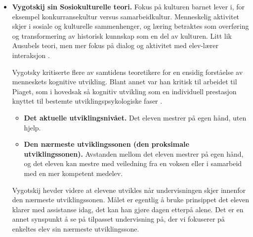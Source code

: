 \documentclass[12pt,a4paper]{article}
\begin{document}
\begin{itemize}
    Det som er viktig er at all ny læring blir satt i perspektiv med allerede eksisterende relevante kunnskapstrukturer. Hvis ikke dette blir gjort kan selv viktig kunnskap mye mye mening bli tolket som meningsløs. 

    \textbf{Advanced organizer:} Ausubel anbefaler apetitt for å vekke de relevante kunnskapsstrukturene og gjøre dem mentalt klar og forberede dem i riktig retning. Ausubel avhenger også god aktivitet med læreren og eleven for at vi skal kunne vise
kobling til relevante strukturer. For mer info se \cite[p. 55-56]{skaalvik2021skolen}.

\item \textbf{Vygotskij sin Sosiokulturelle teori.} Fokus på kulturen barnet lever i, for eksempel konkurransekultur versus samarbeidkultur. Menneskelig aktivitet skjer i sosiale og kulturelle sammenhenger, og læring betraktes som overføring og transformering av historisk
    kunnskap som en del av kulturen. Litt lik Ausubels teori, men mer fokus på dialog og aktivitet med elev-lærer interaksjon \parencite[69]{skaalvik2021skolen}.

Vygotsky kritiserte flere av samtidens teoretikere for en ensidig forståelse av menneskets kognitive utvikling. Blant annet var han kritisk til arbeidet til Piaget, som i hovedsak så kognitiv utvikling som en individuell prestasjon knyttet til
bestemte utviklingspsykologiske faser \parencite[11]{faldet2023vygotsky}.



    \begin{itemize}
        \item \textbf{Det aktuelle utviklingsnivået.}
        Det eleven mestrer på egen hånd, uten hjelp.

        \item \textbf{Den nærmeste utviklingssonen (den proksimale utviklingssonen).}
        Avstanden mellom det eleven mestrer på egen hånd, og det eleven
        kan mestre med veiledning fra en voksen eller i samarbeid med
        en mer kompetent medelev.
    \end{itemize}


Vygotskij hevder videre at elevene utvikles når undervisningen skjer innenfor den nærmeste utviklingssonen. Målet er egentlig å bruke prinsippet det eleven klarer med assistanse idag, det kan han gjøre dagen etterpå alene.  
Det er en annet synspunkt å se på tilpasset undervisning på, der vi fokuserer på enkeltes elev sin nærmeste utviklingssone.  


\end{itemize}
\end{document}
